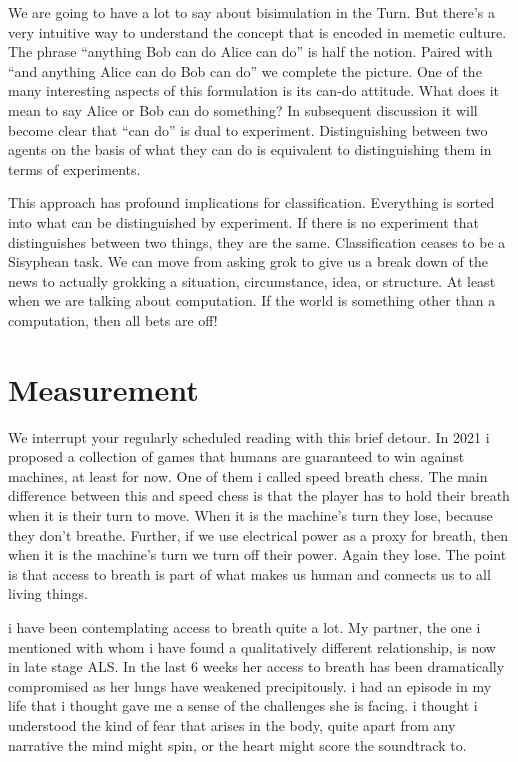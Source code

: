 We are going to have a lot to say about bisimulation in the Turn. But there's a very intuitive way to understand the concept that is encoded in memetic culture. The phrase ``anything Bob can do Alice can do'' is half the notion. Paired with ``and anything Alice can do Bob can do'' we complete the picture. One of the many interesting aspects of this formulation is its can-do attitude. What does it mean to say Alice or Bob can do something? In subsequent discussion it will become clear that ``can do'' is dual to experiment. Distinguishing between two agents on the basis of what they can do is equivalent to distinguishing them in terms of experiments. 

This approach has profound implications for classification. Everything is sorted into what can be distinguished by experiment. If there is no experiment that distinguishes between two things, they are the same. Classification ceases to be a Sisyphean task. We can move from asking grok to give us a break down of the news to actually grokking a situation, circumstance, idea, or structure. At least when we are talking about computation. If the world is something other than a computation, then all bets are off!

\section{Measurement}
\label{sec:pledge-v}

We interrupt your regularly scheduled reading with this brief detour. In 2021 i proposed a collection of games that humans are guaranteed to win against machines, at least for now. One of them i called speed breath chess. The main difference between this and speed chess is that the player has to hold their breath when it is their turn to move. When it is the machine's turn they lose, because they don't breathe. Further, if we use electrical power as a proxy for breath, then when it is the machine's turn we turn off their power. Again they lose. The point is that access to breath is part of what makes us human and connects us to all living things.

i have been contemplating access to breath quite a lot. My partner, the one i mentioned with whom i have found a qualitatively different relationship, is now in late stage ALS. In the last 6 weeks her access to breath has been dramatically compromised as her lungs have weakened precipitously. i had an episode in my life that i thought gave me a sense of the challenges she is facing. i thought i understood the kind of fear that arises in the body, quite apart from any narrative the mind might spin, or the heart might score the soundtrack to.

